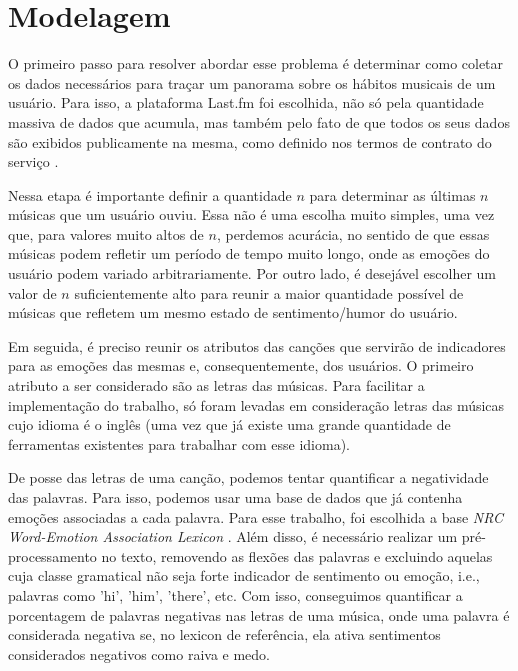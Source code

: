 \section{Modelagem} \label{sec:mod}

O primeiro passo para resolver abordar esse problema é determinar como coletar os dados necessários para traçar um panorama sobre os hábitos
musicais de um usuário. Para isso, a plataforma Last.fm foi escolhida,
não só pela quantidade massiva de dados que acumula, mas também pelo
fato de que todos os seus dados são exibidos publicamente na mesma,
como definido nos termos de contrato do serviço \cite{Lastfmterms}.

Nessa etapa é importante definir a quantidade $ n $ para determinar
 as últimas $ n $ músicas que um usuário ouviu. Essa não é uma escolha
 muito simples, uma vez que, para valores muito altos de $ n $, perdemos
 acurácia, no sentido de que essas músicas podem refletir um período de
 tempo muito longo, onde as emoções do usuário podem variado 
 arbitrariamente. Por outro lado, é desejável escolher um valor de $ n $
 suficientemente alto para reunir a maior quantidade possível de músicas
 que refletem um mesmo estado de sentimento/humor do usuário.

Em seguida, é preciso reunir os atributos das canções que servirão de 
indicadores para as emoções das mesmas e, consequentemente, dos usuários.
O primeiro atributo a ser considerado são as letras das músicas. Para 
facilitar a implementação do trabalho, só foram levadas em consideração
letras das músicas cujo idioma é o inglês (uma vez que já existe uma grande
quantidade de ferramentas existentes para trabalhar com esse idioma).

De posse das letras de uma canção, podemos tentar quantificar a negatividade
das palavras. Para isso, podemos usar uma base de dados que já contenha
emoções associadas a cada palavra. Para esse trabalho, foi escolhida
a base \textit{NRC Word-Emotion Association Lexicon}
\cite{Mohammad13}. Além disso, é necessário realizar um pré-processamento
no texto, removendo as flexões das palavras e excluindo aquelas cuja
classe gramatical não seja forte indicador de sentimento ou emoção, i.e.,
palavras como 'hi', 'him', 'there', etc. Com isso, conseguimos quantificar
a porcentagem de palavras negativas nas letras de uma música, onde uma
palavra é considerada negativa se, no lexicon de referência, ela ativa
sentimentos considerados negativos como raiva e medo.

